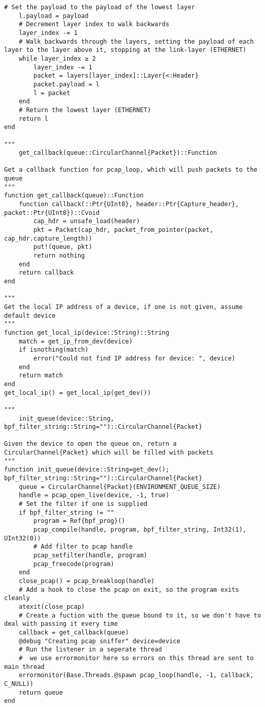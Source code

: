 \begin{lstlisting}[language=JuliaLocal, style=julia]
    # Set the payload to the payload of the lowest layer
    l.payload = payload
    # Decrement layer index to walk backwards
    layer_index -= 1
    # Walk backwards through the layers, setting the payload of each layer to the layer above it, stopping at the link-layer (ETHERNET)
    while layer_index ≥ 2
        layer_index -= 1
        packet = layers[layer_index]::Layer{<:Header}
        packet.payload = l
        l = packet
    end
    # Return the lowest layer (ETHERNET)
    return l
end

"""
    get_callback(queue::CircularChannel{Packet})::Function

Get a callback function for pcap_loop, which will push packets to the queue
"""
function get_callback(queue)::Function
    function callback(::Ptr{UInt8}, header::Ptr{Capture_header}, packet::Ptr{UInt8})::Cvoid
        cap_hdr = unsafe_load(header)
        pkt = Packet(cap_hdr, packet_from_pointer(packet, cap_hdr.capture_length))
        put!(queue, pkt)
        return nothing
    end
    return callback
end 

"""
Get the local IP address of a device, if one is not given, assume default device
"""
function get_local_ip(device::String)::String
    match = get_ip_from_dev(device)
    if isnothing(match)
        error("Could not find IP address for device: ", device)
    end
    return match
end
get_local_ip() = get_local_ip(get_dev())

"""
    init_queue(device::String, bpf_filter_string::String="")::CircularChannel{Packet}

Given the device to open the queue on, return a CircularChannel{Packet} which will be filled with packets
"""
function init_queue(device::String=get_dev(); bpf_filter_string::String="")::CircularChannel{Packet}
    queue = CircularChannel{Packet}(ENVIRONMENT_QUEUE_SIZE)
    handle = pcap_open_live(device, -1, true)
    # Set the filter if one is supplied
    if bpf_filter_string != ""
        program = Ref{bpf_prog}()
        pcap_compile(handle, program, bpf_filter_string, Int32(1), UInt32(0))
        # Add filter to pcap handle
        pcap_setfilter(handle, program)
        pcap_freecode(program)
    end
    close_pcap() = pcap_breakloop(handle)
    # Add a hook to close the pcap on exit, so the program exits cleanly
    atexit(close_pcap)
    # Create a fuction with the queue bound to it, so we don't have to deal with passing it every time
    callback = get_callback(queue)
    @debug "Creating pcap sniffer" device=device
    # Run the listener in a seperate thread
    #  we use errormonitor here so errors on this thread are sent to main thread
    errormonitor(Base.Threads.@spawn pcap_loop(handle, -1, callback, C_NULL))
    return queue
end

\end{lstlisting}
